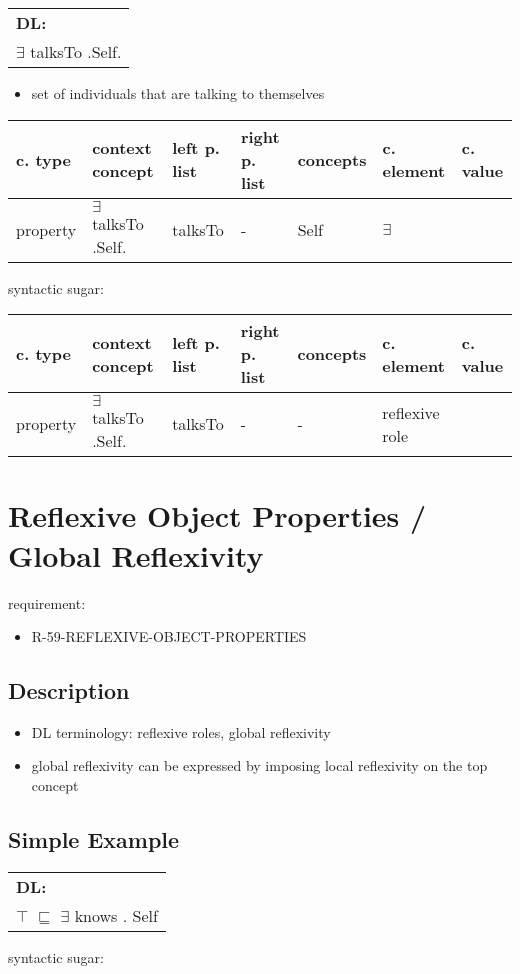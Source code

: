 \documentclass{llncs}
\newenvironment{gcotable}{
  \scriptsize
  \sffamily
  \vspace{0.3cm}
  \begin{tabular}{l|l|l|l|l|l|l}
  \hline
  \textbf{c. type} & \textbf{context concept} & \textbf{left p. list} & \textbf{right p. list} & \textbf{concepts} & \textbf{c. element} & \textbf{c. value} \\
  \hline

}{
  \hline
  \end{tabular}
  \linebreak
}
\newenvironment{DL}{
  \scriptsize
  \sffamily
  \vspace{0.3cm}
  \begin{tabular}{l}
	\textbf{DL:} \\

}{
  \end{tabular}
  \linebreak
}
\begin{document}
\begin{DL}
$\exists$ talksTo .Self. 
\end{DL}

\begin{itemize}
	\item set of individuals that are talking to themselves
\end{itemize}

\begin{gcotable}
property & $\exists$ talksTo .Self.  & talksTo & - & Self & $\exists$ \\
\end{gcotable}

syntactic sugar:

\begin{gcotable}
property & $\exists$ talksTo .Self. & talksTo & - & - & reflexive role \\
\end{gcotable}


\section{Reflexive Object Properties / Global Reflexivity}

requirement:

\begin{itemize}
	\item R-59-REFLEXIVE-OBJECT-PROPERTIES
\end{itemize}

\subsection{Description}

\begin{itemize}
  \item DL terminology: reflexive roles, global reflexivity
	\item global reflexivity can be expressed by imposing local reflexivity on the top concept \cite{Kroetzsch2012}
\end{itemize}

\subsection{Simple Example}

\begin{DL}
$\top$ $\sqsubseteq$ $\exists$ knows . Self
\end{DL}

syntactic sugar:
\end{document}
